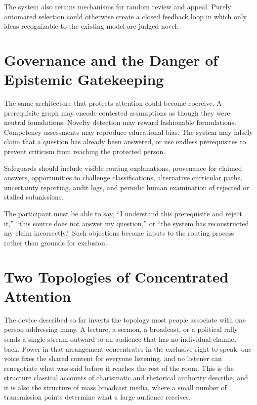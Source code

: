 \documentclass[11pt]{article}
\begin{document}
The system also retains mechanisms for random review and appeal. Purely automated selection could otherwise create a closed feedback loop in which only ideas recognizable to the existing model are judged novel.

\section{Governance and the Danger of Epistemic Gatekeeping}

The same architecture that protects attention could become coercive. A prerequisite graph may encode contested assumptions as though they were neutral foundations. Novelty detection may reward fashionable formulations. Competency assessments may reproduce educational bias. The system may falsely claim that a question has already been answered, or use endless prerequisites to prevent criticism from reaching the protected person.

Safeguards should include visible routing explanations, provenance for claimed answers, opportunities to challenge classifications, alternative curricular paths, uncertainty reporting, audit logs, and periodic human examination of rejected or stalled submissions.

The participant must be able to say, ``I understand this prerequisite and reject it,'' ``this source does not answer my question,'' or ``the system has reconstructed my claim incorrectly.'' Such objections become inputs to the routing process rather than grounds for exclusion.

\section{Two Topologies of Concentrated Attention}

The device described so far inverts the topology most people associate with one person addressing many. A lecture, a sermon, a broadcast, or a political rally sends a single stream outward to an audience that has no individual channel back. Power in that arrangement concentrates in the exclusive right to speak: one voice fixes the shared content for everyone listening, and no listener can renegotiate what was said before it reaches the rest of the room. This is the structure classical accounts of charismatic and rhetorical authority describe, and it is also the structure of mass broadcast media, where a small number of transmission points determine what a large audience receives.
\end{document}
